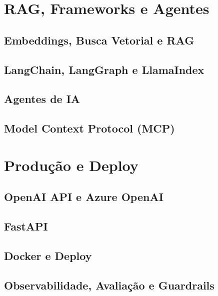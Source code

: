 \documentclass[11pt]{report}
\begin{document}
\part{RAG, Frameworks e Agentes}

\chapter{Embeddings, Busca Vetorial e RAG}


\chapter{LangChain, LangGraph e LlamaIndex}


\chapter{Agentes de IA}


\chapter{Model Context Protocol (MCP)}



\part{Produção e Deploy}

\chapter{OpenAI API e Azure OpenAI}


\chapter{FastAPI}


\chapter{Docker e Deploy}


\chapter{Observabilidade, Avaliação e Guardrails}


\end{document}
